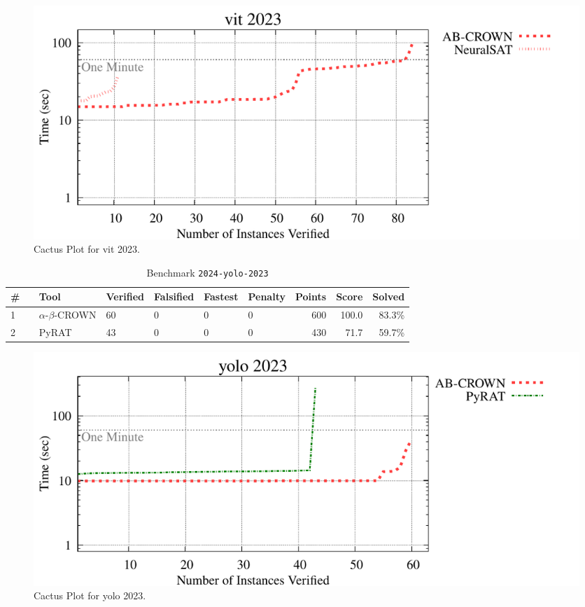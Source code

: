 \begin{figure}[h]
\centerline{\includegraphics[width=\textwidth]{cactus/2024_vit_2023.pdf}}
\caption{Cactus Plot for vit 2023.}
\label{fig:quantPic}
\end{figure}


\clearpage

\begin{table}[h]
\begin{center}
\caption{Benchmark \texttt{2024-yolo-2023}} \label{tab:cat_{cat}}
{\setlength{\tabcolsep}{2pt}
\begin{tabular}[h]{@{}llllllrrr@{}}
\toprule
\textbf{\# ~} & \textbf{Tool} & \textbf{Verified} & \textbf{Falsified} & \textbf{Fastest} & \textbf{Penalty} & \textbf{Points} & \textbf{Score} & \textbf{Solved}\\
\midrule
1 & $\alpha$-$\beta$-CROWN & 60 & 0 & 0 & 0 & 600 & 100.0 & 83.3\% \\
2 & PyRAT & 43 & 0 & 0 & 0 & 430 & 71.7 & 59.7\% \\
\bottomrule
\end{tabular}
}
\end{center}
\end{table}



\begin{figure}[h]
\centerline{\includegraphics[width=\textwidth]{cactus/2024_yolo_2023.pdf}}
\caption{Cactus Plot for yolo 2023.}
\label{fig:quantPic}
\end{figure}

